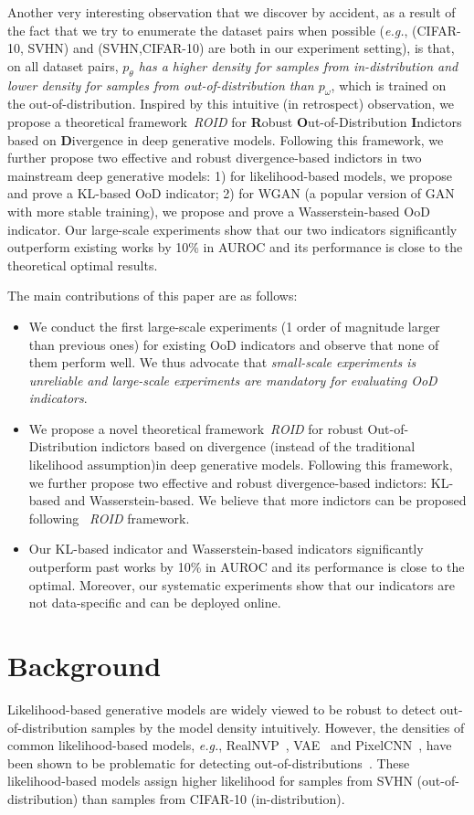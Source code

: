 \documentclass[letterpaper]{article} %
\newcommand{\EG}{\textit{e.g.}, }
\newcommand{\ROID}{\textit{ROID}}
\begin{document}
Another very interesting observation that we discover by accident, as a result of the fact that we try to enumerate the dataset pairs when possible (\EG (CIFAR-10, SVHN) and (SVHN,CIFAR-10) are both in our experiment setting), is that, on all dataset pairs, \textit{$p_\theta$ has a higher density for samples from in-distribution and lower density for samples from out-of-distribution than $p_\omega$}, which is trained on the out-of-distribution. 
Inspired by this intuitive (in retrospect) observation, we propose a theoretical framework~\ROID{} for \textbf{R}obust \textbf{O}ut-of-Distribution \textbf{I}ndictors based on \textbf{D}ivergence in deep generative models. Following  this framework, we further propose two effective and robust divergence-based indictors in two mainstream deep generative models: 1) for likelihood-based models, we propose and prove a KL-based OoD indicator; 2) for WGAN (a popular version of GAN with more stable training), we propose and prove a Wasserstein-based OoD indicator.
Our large-scale experiments show that our two indicators significantly outperform existing works by 10\% in AUROC and its performance is close to the theoretical optimal results.  

The main contributions of this paper are as follows:
\begin{itemize}
	\item We conduct the first large-scale experiments (1 order of magnitude larger than previous ones) for existing OoD indicators and observe that none of them perform well. We thus advocate that \textit{small-scale experiments is unreliable and large-scale experiments are mandatory for evaluating OoD indicators}.
	\item We propose a novel theoretical framework~\ROID{} for robust Out-of-Distribution indictors based on divergence (instead of the traditional likelihood assumption)in deep generative models. Following  this framework, we further propose two effective and robust divergence-based indictors: KL-based and Wasserstein-based. We believe that more indictors can be proposed following ~\ROID{} framework.
	\item Our KL-based indicator and Wasserstein-based indicators significantly outperform past works by 10\% in AUROC and its performance is close to the optimal. Moreover, our systematic experiments show that our indicators are not data-specific and can be deployed online. 
\end{itemize}

\section{Background}
Likelihood-based generative models are widely viewed to be robust to detect out-of-distribution samples by the model density intuitively. However, the densities of common likelihood-based models, \EG RealNVP~\cite{dinh2016density}, VAE~\cite{tomczak2018vae,takahashi2019variational} and PixelCNN~\cite{van2016conditional}, have been shown to be problematic for detecting out-of-distributions~\cite{nalisnick2019do}. These likelihood-based models assign higher likelihood for samples from SVHN (out-of-distribution) than samples from CIFAR-10 (in-distribution). 
\end{document}
